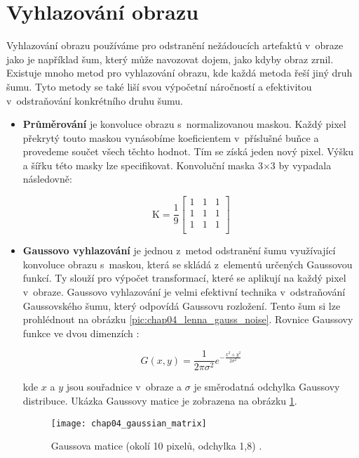 \section{Vyhlazování obrazu}
\label{sec:smoothing}
Vyhlazování obrazu používáme pro odstranění nežádoucích artefaktů v~obraze jako je například šum, který může navozovat dojem, jako kdyby obraz zrnil. Existuje mnoho metod pro vyhlazování obrazu, kde každá metoda řeší jiný druh šumu. Tyto metody se také liší svou výpočetní náročností a efektivitou v~odstraňování konkrétního druhu šumu.
\begin{itemize}
  \item \textbf{Průměrování} je konvoluce obrazu s~normalizovanou maskou. Každý pixel překrytý touto maskou vynásobíme koeficientem v~příslušné buňce a provedeme součet všech těchto hodnot. Tím se získá jeden nový pixel. Výšku a šířku této masky lze specifikovat. Konvoluční maska 3$\times$3 by vypadala následovně:
  
  $$
    \text{K} = \frac{1}{9}\left\lbrack
    \begin{array}{ccc}
      1 & 1 & 1\\
      1 & 1 & 1\\
      1 & 1 & 1\\
    \end{array} \right\rbrack
  $$

  \item \textbf{Gaussovo vyhlazování} je jednou z~metod odstranění šumu využívající konvoluce obrazu s~maskou, která se skládá z~elementů určených Gaussovou funkcí. Ty slouží pro výpočet transformací, které se aplikují na každý pixel v~obraze. Gaussovo vyhlazování je velmi efektivní technika v~odstraňování Gaussovského šumu, který odpovídá Gaussovu rozložení. Tento šum si lze prohlédnout na obrázku \ref{pic:chap04_lenna_gauss_noise}. Rovnice Gaussovy funkce ve dvou dimenzích \cite{comp_vision}:

  \begin{equation}
    G(x,y)=\frac{1}{2\pi\sigma^2}e^{-{\frac{x^2+y^2}{2\sigma^2}}}
  \end{equation}

  kde $x$ a $y$ jsou souřadnice v~obraze a $\sigma$ je směrodatná odchylka Gaussovy distribuce. Ukázka Gaussovy matice je zobrazena na obrázku \ref{pic:chap04_gaussian_matrix}.
  
  \begin{figure}[h]
	\begin{center}
		\texttt{[image: chap04\_gaussian\_matrix]}
		\caption{Gaussova matice (okolí 10 pixelů, odchylka 1,8) \cite{pic_gauss_matrix}.}
		\label{pic:chap04_gaussian_matrix}
	\end{center}
  \end{figure}


\end{itemize}
